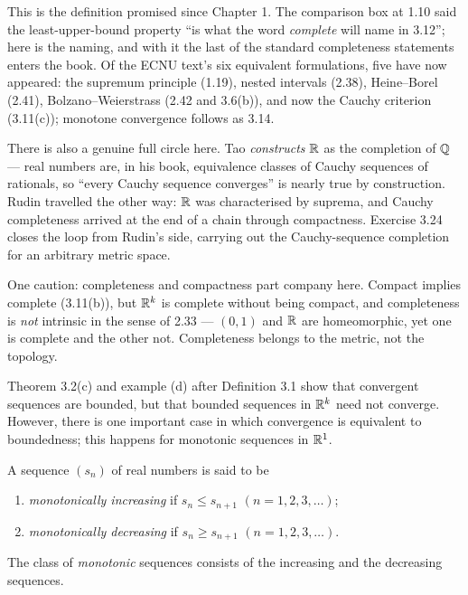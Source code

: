 \begin{deeper}
This is the definition promised since Chapter 1. The comparison box at 1.10
said the least-upper-bound property ``is what the word \emph{complete} will
name in 3.12''; here is the naming, and with it the last of the standard
completeness statements enters the book. Of the ECNU text's six equivalent
formulations, five have now appeared: the supremum principle (1.19), nested
intervals (2.38), Heine--Borel (2.41), Bolzano--Weierstrass (2.42 and 3.6(b)),
and now the Cauchy criterion (3.11(c)); monotone convergence follows as 3.14.

There is also a genuine full circle here. Tao \emph{constructs} $\mathbb{R}$ as the
completion of $\mathbb{Q}$ --- real numbers are, in his book, equivalence classes of
Cauchy sequences of rationals, so ``every Cauchy sequence converges'' is nearly
true by construction. Rudin travelled the other way: $\mathbb{R}$ was characterised by
suprema, and Cauchy completeness arrived at the end of a chain through
compactness. Exercise 3.24 closes the loop from Rudin's side, carrying out the
Cauchy-sequence completion for an arbitrary metric space.

One caution: completeness and compactness part company here. Compact implies
complete (3.11(b)), but $\mathbb{R}^k$ is complete without being compact, and
completeness is \emph{not} intrinsic in the sense of 2.33 --- $(0,1)$ and $\mathbb{R}$
are homeomorphic, yet one is complete and the other not. Completeness belongs
to the metric, not the topology.
\end{deeper}

Theorem 3.2(c) and example (d) after Definition 3.1 show that convergent
sequences are bounded, but that bounded sequences in $\mathbb{R}^k$ need not converge.
However, there is one important case in which convergence is equivalent to
boundedness; this happens for monotonic sequences in $\mathbb{R}^1$.

A sequence $(s_n)$ of real numbers is said to be
\begin{enumerate}[label=(\alph*), leftmargin=2.2em, itemsep=1pt, topsep=3pt]
  \item \emph{monotonically increasing} if $s_n \le s_{n+1}$
        $(n = 1,2,3,\dots)$;
  \item \emph{monotonically decreasing} if $s_n \ge s_{n+1}$
        $(n = 1,2,3,\dots)$.
\end{enumerate}
The class of \emph{monotonic} sequences consists of the increasing and the
decreasing sequences.

